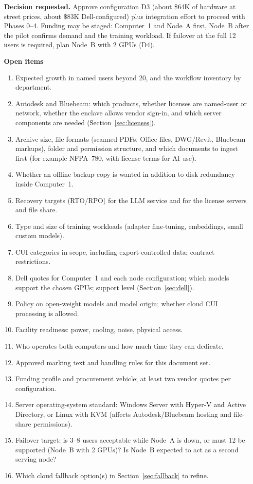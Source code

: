 
\textbf{Decision requested.} Approve configuration D3 (about \$64K of hardware at street
prices, about \$83K Dell-configured) plus integration effort to proceed with Phases 0--4.
Funding may be staged: Computer~1 and Node~A first, Node~B after the pilot confirms
demand and the training workload. If failover at the full 12 users is required, plan
Node~B with 2 GPUs (D4).

\textbf{Open items}
\begin{enumerate}
  \item Expected growth in named users beyond 20, and the workflow inventory by department.
  \item Autodesk and Bluebeam: which products, whether licenses are named-user or network,
    whether the enclave allows vendor sign-in, and which server components are needed
    (Section~\ref{sec:licenses}).
  \item Archive size, file formats (scanned PDFs, Office files, DWG/Revit, Bluebeam
    markups), folder and permission structure, and which documents to ingest first (for
    example NFPA~780, with license terms for AI use).
  \item Whether an offline backup copy is wanted in addition to disk redundancy inside
    Computer~1.
  \item Recovery targets (RTO/RPO) for the LLM service and for the license servers and file share.
  \item Type and size of training workloads (adapter fine-tuning, embeddings, small custom models).
  \item CUI categories in scope, including export-controlled data; contract restrictions.
  \item Dell quotes for Computer~1 and each node configuration; which models support the
    chosen GPUs; support level (Section~\ref{sec:dell}).
  \item Policy on open-weight models and model origin; whether cloud CUI processing is allowed.
  \item Facility readiness: power, cooling, noise, physical access.
  \item Who operates both computers and how much time they can dedicate.
  \item Approved marking text and handling rules for this document set.
  \item Funding profile and procurement vehicle; at least two vendor quotes per configuration.
  \item Server operating-system standard: Windows Server with Hyper-V and Active Directory,
    or Linux with KVM (affects Autodesk/Bluebeam hosting and file-share permissions).
  \item Failover target: is 3--8 users acceptable while Node~A is down, or must 12 be
    supported (Node~B with 2 GPUs)? Is Node~B expected to act as a second serving node?
  \item Which cloud fallback option(s) in Section~\ref{sec:fallback} to refine.
\end{enumerate}
